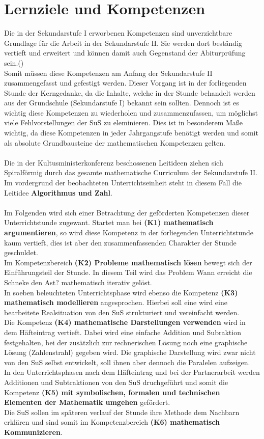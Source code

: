 \chapter{Lernziele und Kompetenzen}

Die in der Sekundarstufe I erworbenen Kompetenzen sind unverzichtbare Grundlage für die Arbeit in der Sekundarstufe II. Sie werden dort beständig vertieft und erweitert und können damit auch Gegenstand  der Abiturprüfung sein.(\cite{kmk12})\\
Somit müssen diese Kompetenzen am Anfang der Sekundarstufe II zusammengefasst und gefestigt werden. Dieser Vorgang ist in der forliegenden Stunde der Kerngedanke, da die Inhalte, welche in der Stunde behandelt werden aus der Grundschule (Sekundarstufe I) bekannt sein sollten. Dennoch ist es wichtig diese Kompetenzen zu wiederholen und zusammenzufassen, um möglichst viele Fehlvorstellungen der SuS zu eleminieren. Dies ist in besonderem Maße wichtig, da diese Kompetenzen in jeder Jahrgangstufe benötigt werden und somit als absolute Grundbausteine der mathematischen Kompetenzen gelten.
\\
\\
Die in der Kultusministerkonferenz beschossenen Leitideen ziehen sich Spiralförmig durch das gesamte mathematische Curriculum der Sekundarstufe II. Im vordergrund der beobachteten Unterrichtseinheit steht in diesem Fall die Leitidee \textbf{Algorithmus und Zahl}.
\\
\\
Im Folgenden wird sich einer Betrachtung der geförderten Kompetenzen dieser Unterrichtstunde zugewant. Startet man bei \textbf{(K1) mathematisch argumentieren}, so wird diese Kompetenz in der forliegenden Unterrichtstunde kaum vertieft, dies ist aber den zusammenfassenden Charakter der Stunde geschuldet.\\
Im Kompetenzbereich \textbf{(K2) Probleme mathematisch lösen} bewegt sich der Einführungsteil der Stunde. In diesem Teil wird das Problem \glqq Wann erreicht die Schneke den Ast? \grqq mathematisch iterativ gelöst.\\
In soeben beleuchteten Unterrichtsphase wird ebenso die Kompetenz \textbf{(K3) mathematisch modellieren} angesprochen. Hierbei soll eine wird eine bearbeitete Realsituation von den SuS strukturiert und vereinfacht werden.\\
Die Kompetenz \textbf{(K4) mathematische Darstellungen verwenden} wird in dem Häfteintrag vertieft. Dabei wird eine einfache Addition und Subraktion festgehalten, bei der zusätzlich zur rechnerischen Lösung noch eine graphische Lösung (Zahlenstrahl) gegeben wird. Die graphische Darstellung wird zwar nicht von den SuS selbst entwickelt, soll ihnen aber dennoch die Paralelen aufzeigen.\\
In den Unterrichtsphasen nach dem Häfteintrag und bei der Partnerarbeit werden Additionen und Subtraktionen von den SuS druchgeführt und somit die Kompetenz \textbf{(K5) mit symbolischen, formalen und technischen Elementen der Mathematik umgehen} gefördert.\\
Die SuS sollen im späteren verlauf der Stunde ihre Methode dem Nachbarn erklären und sind somit im Kompetenzbereich \textbf{(K6) mathematisch Kommunizieren}.

